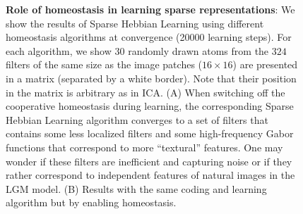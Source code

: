 \documentclass[a4paper, 11pt, draft]{article} %
\newcommand{\dico}{\Phi} %
\begin{document}
%
\begin{figure}%
\caption{
{\bf Role of homeostasis in learning sparse representations}: 
We show the results of Sparse Hebbian Learning using  different homeostasis algorithms at convergence (20000 learning steps). For each algorithm, we show $30$ randomly drawn atoms from the $324$ filters of the same size as the image patches ($16 \times 16$) are presented in a matrix (separated by a white border). Note that their position in the matrix is arbitrary as in ICA. {\sf (A)} When switching off the cooperative homeostasis during learning, the corresponding Sparse Hebbian Learning algorithm converges to a set of filters that contains some less localized filters and some high-frequency Gabor functions that correspond to more ``textural'' features. One may wonder if these filters are inefficient and capturing noise or if they rather correspond to independent features of natural images in the LGM model. {\sf (B)} Results with the same coding and learning algorithm but by enabling homeostasis. %
\label{fig:map}}%
\end{figure}%
\end{document}
